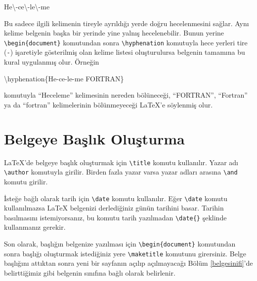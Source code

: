 \documentclass[
  10pt,
]{scrbook}
\newenvironment{Shaded}{}{}
\newcommand{\FunctionTok}[1]{\textcolor[rgb]{0.02,0.16,0.49}{#1}}
\newcommand{\NormalTok}[1]{#1}
\theoremstyle{definition}
\theoremstyle{definition}
\theoremstyle{definition}
\theoremstyle{definition}
\theoremstyle{remark}
\begin{document}
\begin{Shaded}
\begin{Highlighting}[]
\NormalTok{He}\FunctionTok{\textbackslash{}{-}}\NormalTok{ce}\FunctionTok{\textbackslash{}{-}}\NormalTok{le}\FunctionTok{\textbackslash{}{-}}\NormalTok{me}
\end{Highlighting}
\end{Shaded}

Bu sadece ilgili kelimenin tireyle ayrıldığı yerde doğru hecelenmesini sağlar. Aynı kelime belgenin başka bir yerinde yine yalnış hecelenebilir. Bunun yerine \texttt{\textbackslash{}begin\{document\}} komutundan sonra \texttt{\textbackslash{}hyphenation} komutuyla hece yerleri tire (\texttt{-}) işaretiyle gösterilmiş olan kelime listesi oluşturulursa belgenin tamamına bu kural uygulanmış olur. Örneğin

\begin{Shaded}
\begin{Highlighting}[]
\FunctionTok{\textbackslash{}hyphenation}\NormalTok{\{He{-}ce{-}le{-}me FORTRAN\}}
\end{Highlighting}
\end{Shaded}

komutuyla ``Heceleme'' kelimesinin nereden bölüneceği, ``FORTRAN'', ``Fortran'' ya da ``fortran'' kelimelerinin bölünmeyeceği LaTeX'e söylenmiş olur.

\hypertarget{belgeye-baux15flux131k-oluux15fturma}{%
\section{Belgeye Başlık Oluşturma}\label{belgeye-baux15flux131k-oluux15fturma}}

LaTeX'de belgeye başlık oluşturmak için \texttt{\textbackslash{}title} komutu kullanılır. Yazar adı \texttt{\textbackslash{}author} komutuyla girilir. Birden fazla yazar varsa yazar adları arasına \texttt{\textbackslash{}and} komutu girilir.

İsteğe bağlı olarak tarih için \texttt{\textbackslash{}date} komutu kullanılır. Eğer \texttt{\textbackslash{}date} komutu kullanılmazsa LaTeX belgenizi derlediğiniz günün tarihini basar. Tarihin basılmasını istemiyorsanız, bu komutu tarih yazılmadan \texttt{\textbackslash{}date\{\}} şeklinde kullanmanız gerekir.

Son olarak, başlığın belgenize yazılması için \texttt{\textbackslash{}begin\{document\}} komutundan sonra başlığı oluşturmak istediğiniz yere \texttt{\textbackslash{}maketitle} komutunu girersiniz. Belge başlığını attıktan sonra yeni bir sayfanın açılıp açılmayacağı Bölüm \ref{belgesinifi}'de belirttiğimiz gibi belgenin sınıfına bağlı olarak belirlenir.
\end{document}
